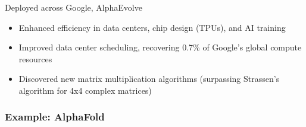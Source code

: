 \begin{frame}
    

    Deployed across Google, AlphaEvolve 

    \begin{itemize}
        \item Enhanced efficiency in data centers, chip design (TPUs), and AI training 
        \vspace{0.5em}
        \item Improved data center scheduling, recovering 0.7\% of Google's global compute resources
        \vspace{0.5em}
        \item Discovered new matrix multiplication algorithms (surpassing Strassen's algorithm for 4x4 complex matrices) 
    \end{itemize}

\end{frame}

\begin{frame}\frametitle{Example: AlphaFold}
    
    \begin{figure}
       \centering
    \end{figure}

\end{frame}


